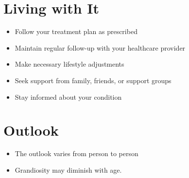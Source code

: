 \section{Living with It}
\begin{itemize}[noitemsep]
  \item Follow your treatment plan as prescribed
  \item Maintain regular follow-up with your healthcare provider
  \item Make necessary lifestyle adjustments
  \item Seek support from family, friends, or support groups
  \item Stay informed about your condition
\end{itemize}
\section{Outlook}
\begin{itemize}[noitemsep]
  \item The outlook varies from person to person
  \item Grandiosity may diminish with age.
\end{itemize}
